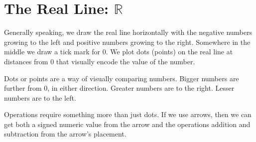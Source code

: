 \documentclass{ximera}
\begin{document}
\section*{The Real Line:  $\mathbb{R}$}





Generally speaking, we draw the real line horizontally with the negative numbers growing to the left and positive numbers growing to the right. Somewhere in the middle we draw a tick mark for $0$. We plot dots (points) on the real line at distances from $0$ that visually encode the value of the number.












  \begin{image}
  \end{image}


Dots or points are a way of visually comparing numbers.  Bigger numbers are further from $0$, in either direction.  Greater numbers are to the right.  Lesser numbers are to the left.




Operations require something more than just dots. If we use arrows, then we can get both a signed numeric value from the arrow and the operations addition and subtraction from the arrow's placement.
\end{document}
